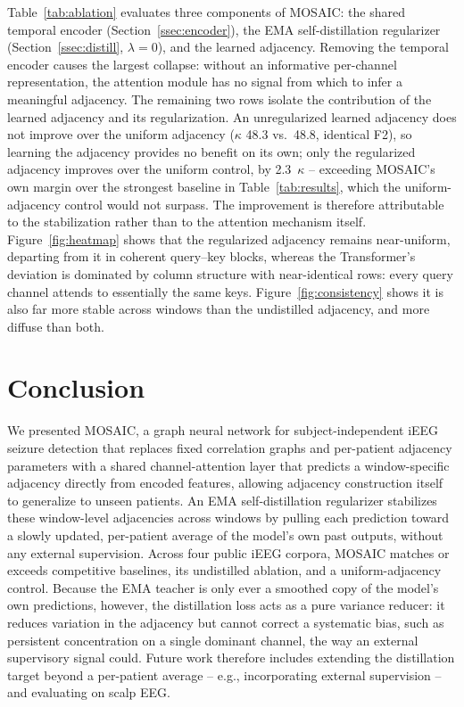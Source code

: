 \documentclass[letterpaper]{article}
\begin{document}
Table~\ref{tab:ablation} evaluates three components of MOSAIC:
 the shared temporal encoder (Section~\ref{ssec:encoder}),
 the EMA self-distillation regularizer
(Section~\ref{ssec:distill}, $\lambda = 0$), and  the learned
adjacency. 
Removing the temporal encoder causes the largest collapse: without an informative per-channel representation, the attention module has no signal from which to infer a meaningful adjacency.
The remaining two rows isolate the contribution of the learned adjacency and its regularization. An
unregularized learned adjacency does not improve over the uniform adjacency
($\kappa$ 48.3 vs.\ 48.8, identical F2), so learning the adjacency provides no benefit on its own; only the regularized adjacency improves over the uniform control,
by 2.3~$\kappa$ -- exceeding MOSAIC's own margin over the strongest
baseline in Table~\ref{tab:results}, which the uniform-adjacency control would not
surpass. The improvement is therefore attributable to the stabilization
rather than to the attention mechanism itself. Figure~\ref{fig:heatmap} shows
that the regularized adjacency remains near-uniform, departing from it in 
coherent query–key blocks, whereas the Transformer's deviation is dominated 
by column structure with near-identical rows: every query channel attends 
to essentially the same keys. Figure~\ref{fig:consistency} shows it is also
far more stable across windows than the undistilled adjacency, and more
diffuse than both.



\section{Conclusion}
\label{sec:conclusion}

We presented MOSAIC, a graph neural network for subject-inde\-pendent
iEEG seizure detection that replaces fixed correlation graphs and per-patient adjacency parameters with a shared channel-attention layer that predicts a window-specific adjacency directly from encoded features, allowing adjacency construction itself to generalize to unseen patients. An EMA
self-distillation regularizer stabilizes these window-level adjacencies across windows by
pulling each prediction toward a slowly updated, per-patient average of
the model's own past outputs, without any external supervision. Across
four public iEEG corpora, MOSAIC matches or exceeds competitive
baselines, its undistilled ablation, and a uniform-adjacency control. Because the EMA teacher is only ever a
smoothed copy of the model's own predictions, however, the distillation
loss acts as a pure variance reducer: it reduces variation in the adjacency but cannot correct a systematic bias, such as persistent concentration on a single dominant channel, the way an external supervisory signal could. Future work
therefore includes extending the distillation target beyond a per-patient
average -- e.g., incorporating external supervision -- and evaluating on
scalp EEG.
\par
\end{document}
